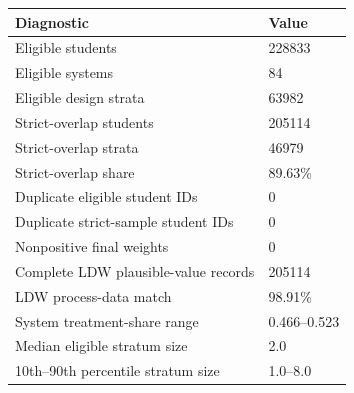 \begin{tabular}{ll}
\toprule
Diagnostic & Value \\
\midrule
Eligible students & 228833 \\
Eligible systems & 84 \\
Eligible design strata & 63982 \\
Strict-overlap students & 205114 \\
Strict-overlap strata & 46979 \\
Strict-overlap share & 89.63\% \\
Duplicate eligible student IDs & 0 \\
Duplicate strict-sample student IDs & 0 \\
Nonpositive final weights & 0 \\
Complete LDW plausible-value records & 205114 \\
LDW process-data match & 98.91\% \\
System treatment-share range & 0.466–0.523 \\
Median eligible stratum size & 2.0 \\
10th–90th percentile stratum size & 1.0–8.0 \\
\bottomrule
\end{tabular}

